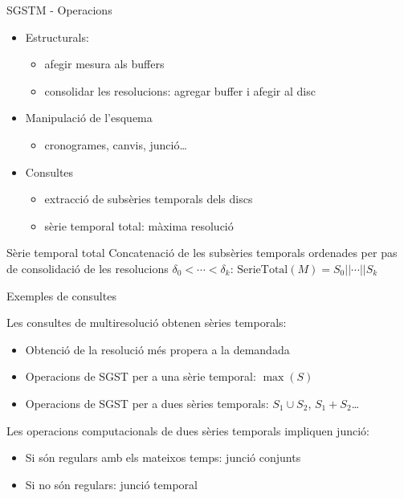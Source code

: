\begin{frame}{SGSTM - Operacions}

  \begin{itemize}
  \item Estructurals: 
    \begin{itemize}
    \item afegir mesura als buffers 
    \item consolidar les resolucions: agregar buffer i afegir al disc
    \end{itemize}

  \item Manipulació de l'esquema
    \begin{itemize}
    \item cronogrames, canvis, junció\dots
    \end{itemize}

  \item Consultes
    \begin{itemize}
    \item extracció de subsèries temporals dels discs
    \item sèrie temporal total: màxima resolució
    \end{itemize}

  \end{itemize}


\begin{block}{Sèrie temporal total}
Concatenació de les subsèries temporals ordenades per pas de consolidació de les resolucions $\delta_0 < \dotsb < \delta_k$:  $\text{SerieTotal}(M)= S_{0} || \dotsb || S_{k}$
\end{block}

\end{frame}



\begin{frame}{Exemples de consultes}

Les consultes de multiresolució obtenen sèries temporals:

\begin{itemize}
\item Obtenció de la resolució més propera a la demandada
\item Operacions de SGST per a una sèrie temporal: $\max(S)$
\item Operacions de SGST per a dues sèries temporals:  $S_1 \cup S_2$, $S_1 + S_2$\dots
\end{itemize}

Les operacions computacionals de dues sèries temporals impliquen junció:

\begin{itemize}
\item Si són regulars amb els mateixos temps: junció conjunts
\item Si no són regulars: junció temporal
\end{itemize}


\end{frame}



